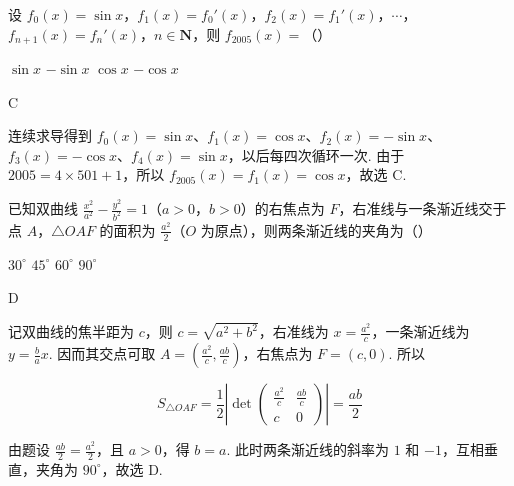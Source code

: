 \begin{problem}
设 \(f_0(x) = \sin x\)，\(f_1(x) = f_0'(x)\)，\(f_2(x) = f_1'(x)\)，\(\cdots\)，\(f_{n+1}(x) = f_n'(x)\)，\(n \in \mathbf{N}\)，则 \(f_{2005}(x) =\)（\quad）

\choices
    {\(\sin x\)}
    {\(-\sin x\)}
    {\(\cos x\)}
    {\(-\cos x\)}

\begin{answer}
C
\end{answer}

\begin{solution}
连续求导得到 \(f_0(x)=\sin x\)、\(f_1(x)=\cos x\)、\(f_2(x)=-\sin x\)、\(f_3(x)=-\cos x\)、\(f_4(x)=\sin x\)，以后每四次循环一次. 由于 \(2005=4\times501+1\)，所以 \(f_{2005}(x)=f_1(x)=\cos x\)，故选 C.
\end{solution}
\end{problem}

\begin{problem}
已知双曲线 \(\frac{x^2}{a^2} - \frac{y^2}{b^2} = 1\)（\(a > 0\)，\(b > 0\)）的右焦点为 \(F\)，右准线与一条渐近线交于点 \(A\)，\(\triangle OAF\) 的面积为 \(\frac{a^2}{2}\)（\(O\) 为原点），则两条渐近线的夹角为（\quad）

\choices
    {\(30^{\circ}\)}
    {\(45^{\circ}\)}
    {\(60^{\circ}\)}
    {\(90^{\circ}\)}

\begin{answer}
D
\end{answer}

\begin{solution}
记双曲线的焦半距为 \(c\)，则 \(c=\sqrt{a^2+b^2}\)，右准线为 \(x=\frac{a^2}{c}\)，一条渐近线为 \(y=\frac{b}{a}x\). 因而其交点可取 \(A=\left(\frac{a^2}{c},\frac{ab}{c}\right)\)，右焦点为 \(F=(c,0)\). 所以

\[
S_{\triangle OAF}=\frac12\left|\det\begin{pmatrix}\frac{a^2}{c}&\frac{ab}{c}\\ c&0\end{pmatrix}\right|=\frac{ab}{2}
\]

由题设 \(\frac{ab}{2}=\frac{a^2}{2}\)，且 \(a>0\)，得 \(b=a\). 此时两条渐近线的斜率为 \(1\) 和 \(-1\)，互相垂直，夹角为 \(90^{\circ}\)，故选 D.
\end{solution}
\end{problem}

